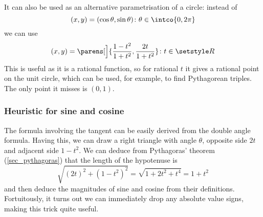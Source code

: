 It can also be used as an alternative parametrisation of a circle: instead
of
\begin{equation*}
 (x, y) = (\cos\theta, \sin\theta) \colon \theta \in \intco{0, 2\pi}
\end{equation*}
we can use
\begin{equation*}
 (x, y) = \parens[\Big]{\frac{1 - t^2}{1 + t^2},
                        \frac{2t}{1 + t^2}} \colon t \in \Reals
\end{equation*}
This is useful as it is a rational function, so for rational \(t\) it gives
a rational point on the unit circle, which can be used, for example, to find
Pythagorean triples. The only point it misses is \((0, 1)\).

\subsubsection{Heuristic for sine and cosine}


The formula involving the tangent can be easily derived from the double
angle formula. Having this, we can draw a right triangle with angle
\(\theta\), opposite side \(2t\) and adjacent side \(1 - t^2\). We can
deduce from Pythagoras' theorem (\ref{sec_pythagoras}) that the length of
the hypotenuse is
\begin{equation*}
 \sqrt{(2t)^2 + (1 - t^2)^2} = \sqrt{1 + 2t^2 + t^4} = 1 + t^2
\end{equation*}
and then deduce the magnitudes of sine and cosine from their definitions.
Fortuitously, it turns out we can immediately drop any absolute value
signs, making this trick quite useful.
